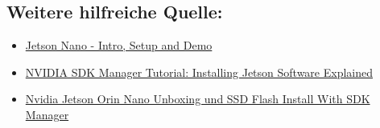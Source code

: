 \documentclass[12pt,a4paper]{report}
\begin{document}
\subsection{Weitere hilfreiche Quelle:}
\begin{itemize}
    \item \textcolor{blue}{\href{https://youtu.be/km0yT99eVTY?feature=shared}{Jetson Nano - Intro, Setup and Demo}}
    \item \textcolor{blue}{\href{https://youtu.be/Ucg5Zqm9ZMk?feature=shared}{NVIDIA SDK Manager Tutorial: Installing Jetson Software Explained}}
    \item \textcolor{blue}{\href{https://youtu.be/FX2exKW_20E?feature=shared}{Nvidia Jetson Orin Nano Unboxing und SSD Flash Install With SDK Manager}}
\end{itemize}
\end{document}

